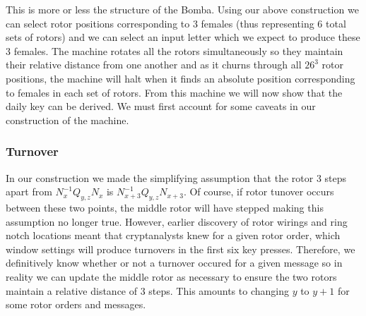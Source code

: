 \noindent This is more or less the structure of the Bomba. Using our above construction we can select rotor positions corresponding to 3 females (thus representing 6 total sets of rotors) and we can select an input letter which we expect to produce these 3 females. The machine rotates all the rotors simultaneously so they maintain their relative distance from one another and as it churns through all $26^3$ rotor positions, the machine will halt when it finds an absolute position corresponding to females in each set of rotors. From this machine we will now show that the daily key can be derived. We must first account for some caveats in our construction of the machine.

\subsubsection{Turnover}
In our construction we made the simplifying assumption that the rotor 3 steps apart from $N_{x}^{-1}Q_{y,z}N_{x}$ is $N_{x+3}^{-1}Q_{y,z}N_{x+3}$. Of course, if rotor tunover occurs between these two points, the middle rotor will have stepped making this assumption no longer true. However, earlier discovery of rotor wirings and ring notch locations meant that cryptanalysts knew for a given rotor order, which window settings will produce turnovers in the first six key presses. Therefore, we definitively know whether or not a turnover occured for a given message so in reality we can update the middle rotor as necessary to ensure the two rotors maintain a relative distance of 3 steps. This amounts to changing $y$ to $y+1$ for some rotor orders and messages.
